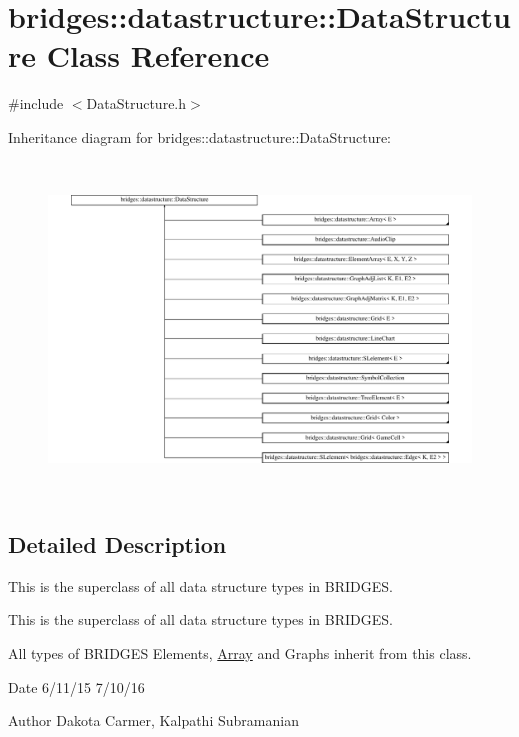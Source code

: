 \hypertarget{classbridges_1_1datastructure_1_1_data_structure}{}\section{bridges\+:\+:datastructure\+:\+:Data\+Structure Class Reference}
\label{classbridges_1_1datastructure_1_1_data_structure}


{\ttfamily \#include $<$Data\+Structure.\+h$>$}

Inheritance diagram for bridges\+:\+:datastructure\+:\+:Data\+Structure\+:\begin{figure}[H]
\begin{center}
\leavevmode
\includegraphics[height=8.848759cm]{classbridges_1_1datastructure_1_1_data_structure}
\end{center}
\end{figure}


\subsection{Detailed Description}
This is the superclass of all data structure types in B\+R\+I\+D\+G\+ES. 

This is the superclass of all data structure types in B\+R\+I\+D\+G\+ES.

All types of B\+R\+I\+D\+G\+ES Elements, \hyperlink{classbridges_1_1datastructure_1_1_array}{Array} and Graphs inherit from this class.

\begin{DoxyDate}{Date}
6/11/15 7/10/16 
\end{DoxyDate}
\begin{DoxyAuthor}{Author}
Dakota Carmer, Kalpathi Subramanian 
\end{DoxyAuthor}
